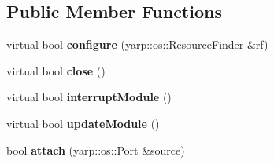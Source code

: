 \subsection*{Public Member Functions}
\begin{DoxyCompactItemize}
\item 
virtual bool {\bfseries configure} (yarp\+::os\+::\+Resource\+Finder \&rf)\label{classGBSegmModule_ada22cbfc66dd9b75a7a824e1ce642639}

\item 
virtual bool {\bfseries close} ()\label{classGBSegmModule_ac3259b29883674bf47aa962f54806913}

\item 
virtual bool {\bfseries interrupt\+Module} ()\label{classGBSegmModule_a99b9908ade3135dd5ee491b799d5e171}

\item 
virtual bool {\bfseries update\+Module} ()\label{classGBSegmModule_a66f40b6ae480a039a2c10f6b91c59dde}

\item 
bool {\bfseries attach} (yarp\+::os\+::\+Port \&source)\label{classGBSegmModule_a4ae8d5fee391d799299a10e09a5ea8c4}


\end{DoxyCompactItemize}
